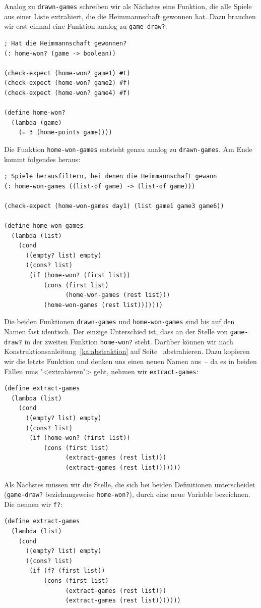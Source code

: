 Analog zu \lstinline{drawn-games} schreiben wir als Nächstes eine
Funktion, die alle Spiele aus einer Liste extrahiert, die die Heimmannschaft
gewonnen hat.  Dazu brauchen wir erst einmal eine Funktion analog zu
\lstinline{game-draw?}:
%
\begin{lstlisting}
; Hat die Heimmannschaft gewonnen?
(: home-won? (game -> boolean))

(check-expect (home-won? game1) #t)
(check-expect (home-won? game2) #f)
(check-expect (home-won? game4) #f)

(define home-won?
  (lambda (game)
    (= 3 (home-points game))))
\end{lstlisting}
%
Die Funktion \lstinline{home-won-games} entsteht genau analog zu
\lstinline{drawn-games}.  Am Ende kommt folgendes heraus:
%
\begin{lstlisting}
; Spiele herausfiltern, bei denen die Heimmannschaft gewann
(: home-won-games ((list-of game) -> (list-of game)))

(check-expect (home-won-games day1) (list game1 game3 game6))

(define home-won-games
  (lambda (list)
    (cond
      ((empty? list) empty)
      ((cons? list)
       (if (home-won? (first list))
           (cons (first list)
                 (home-won-games (rest list)))
           (home-won-games (rest list)))))))
\end{lstlisting}
%
Die beiden Funktionen \lstinline{drawn-games} und
\lstinline{home-won-games} sind bis auf den Namen fast identisch.  Der
einzige Unterschied ist, dass an der Stelle von \lstinline{game-draw?}
in der zweiten Funktion \lstinline{home-won?} steht.  Darüber können
wir nach Konstruktionsanleitung~\ref{ka:abstraktion} auf
Seite~\pageref{ka:abstraktion} abstrahieren.  Dazu kopieren wir die
letzte Funktion und denken uns einen neuen Namen aus~-- da es in
beiden Fällen ums "<extrahieren"> geht, nehmen wir
\lstinline{extract-games}:
%
\begin{lstlisting}
(define extract-games
  (lambda (list)
    (cond
      ((empty? list) empty)
      ((cons? list)
       (if (home-won? (first list))
           (cons (first list)
                 (extract-games (rest list)))
                 (extract-games (rest list)))))))
\end{lstlisting}
%
Als Nächstes müssen wir die Stelle, die sich bei beiden Definitionen
unterscheidet (\lstinline{game-draw?} beziehungsweise
\lstinline{home-won?}), durch eine neue Variable bezeichnen.  Die nennen wir
\lstinline{f?}:
%
\begin{lstlisting}
(define extract-games
  (lambda (list)
    (cond
      ((empty? list) empty)
      ((cons? list)
       (if (f? (first list))
           (cons (first list)
                 (extract-games (rest list)))
                 (extract-games (rest list)))))))
\end{lstlisting}
